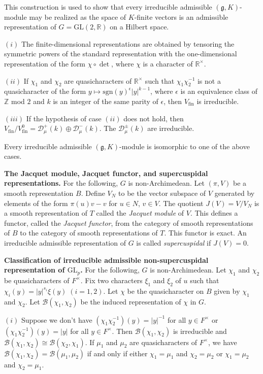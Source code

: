 \documentclass[12pt, letterpaper, twoside]
{article}
\newcommand{\Z}{{\mathbb Z}} %
\newcommand{\R}{{\mathbb R}} %
\newcommand{\GL}{{\text{GL}}} %
\newcommand{\gI}{\mathfrak{g}} %
\begin{document}
This construction is used to show that every irreducible admissible $(\gI,
K)$-module may be realized as the space of $K$-finite vectors is an admissible
representation of $G = \GL(2, \R)$ on a Hilbert space.

$(i)$ The finite-dimensional representations are obtained by tensoring the
symmetric powers of the standard representation with the one-dimensional
representation of the form $\chi \circ \det$, where $\chi$ is a character of
$\R^\times$.

$(ii)$ If $\chi_1$ and $\chi_2$ are quasicharacters of $\R^\times$ such that
$\chi_1\chi_2^{-1}$ is not a quasicharacter of the form $y \mapsto
\text{sgn}(y)^\epsilon |y|^{k - 1}$, where $\epsilon$ is an equivalence class of
$\Z$ mod $2$ and $k$ is an integer of the same parity of $\epsilon$, then
$V_{\text{fin}}$ is irreducible. 

$(iii)$ If the hypothesis of case $(ii)$ does not hold, then
$V_{\text{fin}}/V_{\text{fin}}^0 = \mathcal{D}_\mu^+(k) \oplus
\mathcal{D}_\mu^-(k)$. The $\mathcal{D}_\mu^{\pm}(k)$ are irreducible.

Every irreducible admissible $(\gI, K)$-module is isomorphic to one of the above
cases.

\textbf{The Jacquet module, Jacquet functor, and supercuspidal representations.}
For the following, $G$ is non-Archimedean. Let $(\pi, V)$ be a smooth
representation $B$. Define $V_N$ to be the vector subspace of $V$ generated by
elements of the form $\pi(u)v - v$ for $u \in N$, $v \in V$. The quotient $J(V)
= V/V_N$ is a smooth representation of $T$ called the \textit{Jacquet module} of
$V$. This defines a functor, called the \textit{Jacquet functor}, from the
category of smooth representations of $B$ to the category of smooth
representations of $T$. This functor is exact. An irreducible admissible
representation of $G$ is called \textit{supercuspidal} if $J(V) = 0$.

\textbf{Classification of irreducible admissible non-supercuspidal
representation of $\GL_p$.}  For the following, $G$ is non-Archimedean. Let
$\chi_1$ and $\chi_2$ be quasicharacters of $F^\times$. Fix two characters
$\xi_1$ and $\xi_2$ of $u$ such that $\chi_i(y) = |y|^{s_i}\xi(y) \; (i = 1,
2)$. Let $\chi$ be the quasicharacter on $B$ given by $\chi_1$ and $\chi_2$. Let
$\mathcal{B}(\chi_1, \chi_2)$ be the induced representation of $\chi$ in $G$. 

$(i)$ Suppose we don't have $(\chi_1\chi_2^{-1})(y) = |y|^{-1}$ for all $y \in
F^\times$ or $(\chi_1\chi_2^{-1})(y) = |y|$ for all $y \in F^\times$. Then
$\mathcal{B}(\chi_1, \chi_2)$ is irreducible and $\mathcal{B}(\chi_1, \chi_2)
\cong \mathcal{B}(\chi_2, \chi_1)$. If $\mu_1$ and $\mu_2$ are quasicharacters
of $F^\times$, we have $\mathcal{B}(\chi_1, \chi_2) = \mathcal{B}(\mu_1, \mu_2)$
if and only if either $\chi_1 = \mu_1$ and $\chi_2 = \mu_2$ or $\chi_1 = \mu_2$
and $\chi_2 = \mu_1$.
\end{document}
